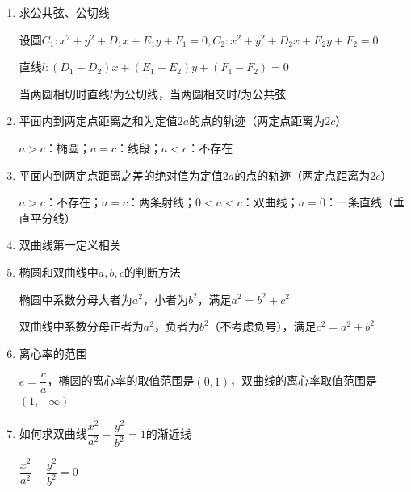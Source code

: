 \begin{enumerate}
    \item 求公共弦、公切线
    \begin{jieda}
        设圆$C_1: x^2+y^2+D_1x+E_1y+F_1 = 0, C_2: x^2+y^2+D_2x+E_2y+F_2 = 0$

        直线$l: (D_1 - D_2)x + (E_1 - E_2)y + (F_1-F_2) = 0$

        当两圆相切时直线$l$为公切线，当两圆相交时$l$为公共弦
    \end{jieda}

    \item 平面内到两定点距离之和为定值$2a$的点的轨迹（两定点距离为$2c$）
    \begin{jieda}
        $a > c$：椭圆；$a = c$：线段；$a < c$：不存在
    \end{jieda}
    
    \item 平面内到两定点距离之差的绝对值为定值$2a$的点的轨迹（两定点距离为$2c$）
    \begin{jieda}
        $a > c$：不存在；$a = c$：两条射线；$0 < a < c$：双曲线；$a = 0$：一条直线（垂直平分线）
    \end{jieda}

    \item 双曲线第一定义相关
    \begin{jieda}
    \end{jieda}
    
    \item 椭圆和双曲线中$a,b,c$的判断方法
    \begin{jieda}
        椭圆中系数分母大者为$a^2$，小者为$b^2$，满足$a^2 = b^2+c^2$

        双曲线中系数分母正者为$a^2$，负者为$b^2$（不考虑负号），满足$c^2 = a^2+b^2$
    \end{jieda}

    \item 离心率的范围
    \begin{jieda}
        $e = \dfrac{c}{a}$，椭圆的离心率的取值范围是$(0, 1)$，双曲线的离心率取值范围是$(1, +\infty)$
    \end{jieda}
    
    \item 如何求双曲线$\dfrac{x^2}{a^2} - \dfrac{y^2}{b^2} = 1$的渐近线
    \begin{jieda}
        $\dfrac{x^2}{a^2} - \dfrac{y^2}{b^2} = 0$
    \end{jieda}
    

\end{enumerate}

